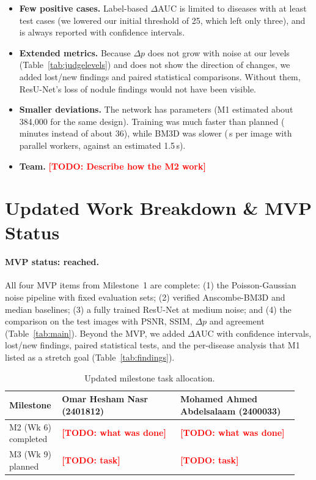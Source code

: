 \documentclass[11pt]{article}
\newcommand{\todo}[1]{\textcolor{red}{\textbf{[TODO: #1]}}}
\begin{document}
\begin{itemize}[leftmargin=*]
  \item \textbf{Few positive cases.} Label-based $\Delta$AUC is limited to \NumAUCDiseases{} diseases with at least \MinPos{} test cases (we lowered our initial threshold of 25, which left only three), and is always reported with confidence intervals.
  \item \textbf{Extended metrics.} Because $\Delta p$ does not grow with noise at our levels (Table~\ref{tab:judgelevels}) and does not show the direction of changes, we added lost/new findings and paired statistical comparisons. Without them, ResU-Net's loss of nodule findings would not have been visible.
  \item \textbf{Smaller deviations.} The network has \Params{} parameters (M1 estimated about 384{,}000 for the same design). Training was much faster than planned (\TrainMinutes\,minutes instead of about 36), while BM3D was slower (\BMSec\,s per image with parallel workers, against an estimated 1.5\,s).
  \item \textbf{Team.} \todo{Describe how the M2 work}
\end{itemize}

\section{Updated Work Breakdown \& MVP Status}
\label{sec:workbreakdown}
\paragraph{MVP status: reached.} All four MVP items from Milestone~1 are complete: (1) the Poisson-Gaussian noise pipeline with fixed evaluation sets; (2) verified Anscombe-BM3D and median baselines; (3) a fully trained ResU-Net at medium noise; and (4) the comparison on the \NTest{} test images with PSNR, SSIM, $\Delta p$ and agreement (Table~\ref{tab:main}). Beyond the MVP, we added $\Delta$AUC with confidence intervals, lost/new findings, paired statistical tests, and the per-disease analysis that M1 listed as a stretch goal (Table~\ref{tab:findings}).

\begin{table}[htbp]
\centering
\caption{Updated milestone task allocation.}
\label{tab:tasks}
\begin{tabular}{@{}p{0.16\linewidth}p{0.39\linewidth}p{0.39\linewidth}@{}}
\toprule
\textbf{Milestone} & \textbf{Omar Hesham Nasr (2401812)} & \textbf{Mohamed Ahmed Abdelsalaam (2400033)} \\
\midrule
M2 (Wk 6) \newline completed & \todo{what was done} & \todo{what was done} \\
\midrule
M3 (Wk 9) \newline planned & \todo{task} & \todo{task} \\
\bottomrule
\end{tabular}
\end{table}
\end{document}
